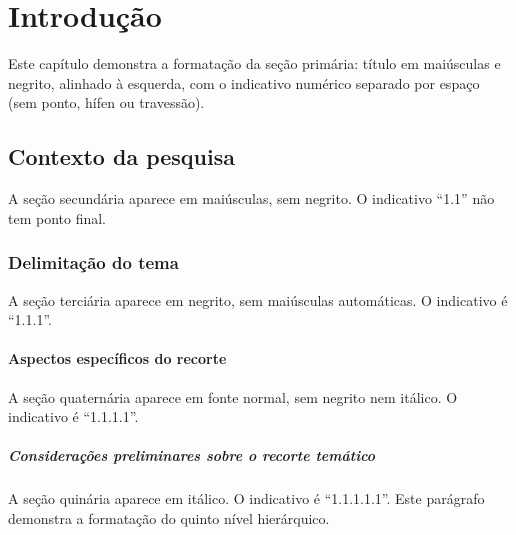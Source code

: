 \documentclass[a4paper, 12pt]{report}
\begin{document}
\chapter{Introdução}

Este capítulo demonstra a formatação da seção primária: título em maiúsculas
e negrito, alinhado à esquerda, com o indicativo numérico separado por espaço
(sem ponto, hífen ou travessão).

\section{Contexto da pesquisa}

A seção secundária aparece em maiúsculas, sem negrito. O indicativo ``1.1''
não tem ponto final.

\subsection{Delimitação do tema}

A seção terciária aparece em negrito, sem maiúsculas automáticas. O indicativo
é ``1.1.1''.

\subsubsection{Aspectos específicos do recorte}

A seção quaternária aparece em fonte normal, sem negrito nem itálico. O
indicativo é ``1.1.1.1''.

\paragraph{Considerações preliminares sobre o recorte temático}

A seção quinária aparece em itálico. O indicativo é ``1.1.1.1.1''. Este
parágrafo demonstra a formatação do quinto nível hierárquico.

\end{document}
